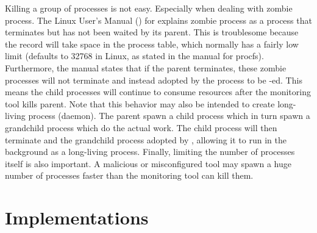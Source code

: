 {\begin{enumerate}
        Killing a group of processes is not easy.
        Especially when dealing with zombie process.
        The Linux User's Manual (\citeyear{manpages}) for  explains zombie process as a process that terminates but has not been waited by its parent.
        This is troublesome because the record will take space in the process table, which normally has a fairly low limit (defaults to 32768 in Linux, as stated in the manual for procfs).
        Furthermore, the manual states that if the parent terminates, these zombie processes will not terminate and instead adopted by the  process to be -ed.
        This means the child processes will continue to consume resources after the monitoring tool kills parent.
        Note that this behavior may also be intended to create long-living process (daemon).
        The parent spawn a child process which in turn spawn a grandchild process which do the actual work.
        The child process will then terminate and the grandchild process adopted by , allowing it to run in the background as a long-living process.
        Finally, limiting the number of processes itself is also important.
        A malicious or misconfigured tool may spawn a huge number of processes faster than the monitoring tool can kill them.

    \end{enumerate}
}


\section{Implementations}
\label{sec:resource.impl}


